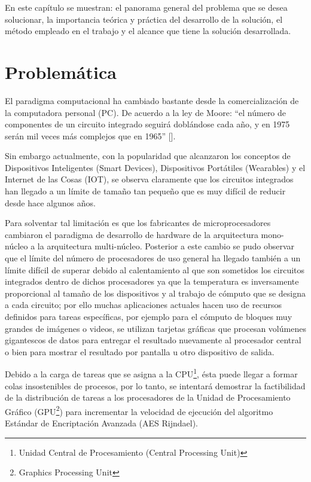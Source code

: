 \documentclass[../main/main.tex]{subfiles}
\begin{document}
\espacio

  En este capítulo se muestran: el panorama general del problema que se desea solucionar, la importancia teórica y práctica del desarrollo de la solución, el método empleado en el trabajo y el alcance que tiene la solución desarrollada.

  \section{Problemática}

  El paradigma computacional ha cambiado bastante desde la comercialización de la computadora personal (PC). De acuerdo a la ley de Moore: ``el número de componentes de un circuito integrado seguirá doblándose cada año, y en 1975 serán mil veces más complejos que en 1965'' [\cite[p.~2]{article:ley_de_moore}].

  Sin embargo actualmente, con la popularidad que alcanzaron los conceptos de Dispositivos Inteligentes (Smart Devices), Dispositivos Portátiles (Wearables) y el Internet de las Cosas (IOT), se observa claramente que los circuitos integrados han llegado a un límite de tamaño tan pequeño que es muy difícil de reducir desde hace algunos años.

  Para solventar tal limitación es que los fabricantes de microprocesadores cambiaron el paradigma de desarrollo de hardware de la arquitectura mono-núcleo a la arquitectura multi-núcleo. Posterior a este cambio se pudo observar que el límite del número de procesadores de uso general ha llegado también a un límite difícil de superar debido al calentamiento al que son sometidos los circuitos integrados dentro de dichos procesadores ya que la temperatura es inversamente proporcional al tamaño de los dispositivos y al trabajo de cómputo que se designa a cada circuito; por ello muchas aplicaciones actuales hacen uso de recursos definidos para tareas específicas, por ejemplo para el cómputo de bloques muy grandes de imágenes o videos, se utilizan tarjetas gráficas que procesan volúmenes gigantescos de datos para entregar el resultado nuevamente al procesador central o bien para mostrar el resultado por pantalla u otro dispositivo de salida.

  Debido a la carga de tareas que se asigna a la CPU\footnote{Unidad Central de Procesamiento (Central Processing Unit)}, ésta puede llegar a formar colas insostenibles de procesos, por lo tanto, se intentará demostrar la factibilidad de la distribución de tareas a los procesadores de la Unidad de Procesamiento Gráfico (GPU\footnote{Graphics Processing Unit}) para incrementar la velocidad de ejecución del algoritmo Estándar de Encriptación Avanzada (AES Rijndael).
\end{document}
